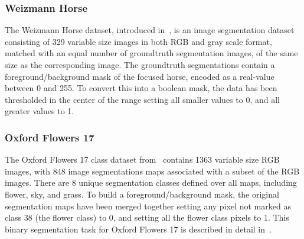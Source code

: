 \subsubsection{Weizmann Horse}
The Weizmann Horse dataset, introduced in~\cite{Borenstein04combiningtop-down},
is an image segmentation dataset consisting of 329 variable size images in both
RGB and gray scale format, matched with an equal number of groundtruth
segmentation images, of the same size as the corresponding image. The
groundtruth segmentations contain a foreground/background mask of the focused
horse, encoded as a real-value between 0 and 255. To convert this into a
boolean mask, the data has been thresholded in the center of the range setting
all smaller values to 0, and all greater values to 1.


\subsubsection{Oxford Flowers 17}
The Oxford Flowers 17 class dataset from~\cite{Nilsback06} contains 1363
variable size RGB images, with 848 image segmentations maps associated with
a subset of the RGB images. There are 8 unique segmentation classes defined
over all maps, including flower, sky, and grass. To build a
foreground/background mask, the original segmentation maps have been merged
together setting any pixel not marked as class 38 (the flower class) to 0, and
setting all the flower class pixels to 1. This binary segmentation task for
Oxford Flowers 17 is described in detail in~\cite{Xiaomeng14}.

